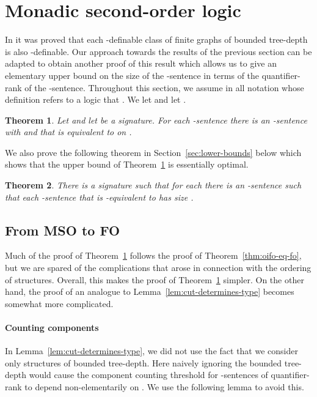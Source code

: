 \documentclass[11pt]{article}
\newtheorem{theorem}{Theorem}
\begin{document}
\section{Monadic second-order logic}
\label{sec:mso}

In \cite{ElberfeldGT12} it was proved that each -definable class of
finite graphs of bounded tree-depth is also -definable.  Our approach
towards the results of the previous section can be adapted to obtain another
proof of this result which allows us to give an elementary upper bound on the
size of the -sentence in terms of the quantifier-rank of the
-sentence.  Throughout this section, we assume in all notation whose
definition refers to a logic  that .  We let
 and let
.

\begin{theorem}
  \label{thm:mso-eq-fo}
  Let  and let  be a signature. For each
  -sentence  there is an -sen\-tence  with
   and  that is equivalent
  to  on .
\end{theorem}

We also prove the following theorem in Section~\ref{sec:lower-bounds} below
which shows that the upper bound of Theorem~\ref{thm:mso-eq-fo} is essentially
optimal.

\begin{theorem}
  \label{thm:mso-lower-bound}
  There is a signature  such that for each  there is an
  -sentence  such that each -sentence 
  that is -equivalent to  has size .
\end{theorem}

\subsection{From MSO to FO}

Much of the proof of Theorem~\ref{thm:mso-eq-fo} follows the proof of
Theorem~\ref{thm:oifo-eq-fo}, but we are spared of the complications that arose
in connection with the ordering of structures.  Overall, this makes the proof of
Theorem~\ref{thm:mso-eq-fo} simpler.  On the other hand, the proof of an
analogue to Lemma~\ref{lem:cut-determines-type} becomes somewhat more
complicated.

\paragraph{Counting components}

In Lemma~\ref{lem:cut-determines-type}, we did not use the fact that we consider
only structures of bounded tree-depth. Here naively ignoring the bounded
tree-depth would cause the component counting threshold for -sentences of
quantifier-rank  to depend non-elementarily on . We use the following
lemma to avoid this.
\end{document}
